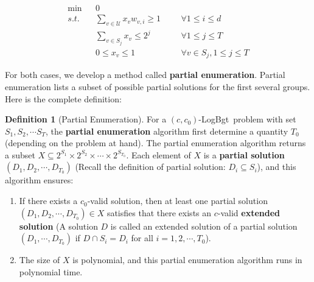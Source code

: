 \documentclass[11pt,a4paper]{article} \usepackage{enumitem}
\newcommand{\calU}{\mathcal{U}}
\newcommand{\LBO}{\textsf{LogBgt}}
\theoremstyle{definition}
\newtheorem{definition}{Definition}[section]
\begin{document}
\begin{equation}
\begin{aligned}
	\min && 0 && & \\
    s.t. && \sum_{v\in \calU} x_v w_{v,i}\geq 1 && & \forall 1\leq i\leq d\\
    && \sum_{v\in S_j} x_v\leq 2^j && & \forall 1\leq j\leq T\\
    && 0\leq x_v\leq 1 && & \forall v\in S_j,1\leq j\leq T
\end{aligned}
\tag{LP-KnapCover-1}
\label{LP-KnapCover-1}
\end{equation}

For both cases, we develop a method called \textbf{partial enumeration}. Partial enumeration lists a subset of possible partial solutions for the first several groups. Here is the complete definition:

\begin{definition}[Partial Enumeration] \label{def:part-enum}
For a $(c,c_0)$-\LBO\ problem with set $S_1,S_2,\cdots S_{T}$, the \textbf{partial enumeration} algorithm first determine a quantity $T_0$ (depending on the problem at hand). The partial enumeration algorithm returns a subset $X\subseteq 2^{S_1}\times 2^{S_2}\times \cdots \times 2^{S_{T_0}}$. Each element of $X$ is a \textbf{partial solution} $(D_1,D_2,\cdots, D_{T_0})$ (Recall the definition of partial solution: $D_i\subseteq S_i$), and this algorithm ensures: 

\begin{enumerate}
    \item If there exists a $c_0$-valid solution, then at least one partial solution $(D_1,D_2,\cdots, D_{T_0})\in X$ satisfies
    that 
    there exists an $c$-valid \textbf{extended solution} (A solution $D$ is called an extended solution of a partial solution $(D_1,\cdots,D_{T_0})$ if $D\cap S_i=D_i$ for all $i=1,2,\cdots, T_0$).

    \item The size of $X$ is polynomial, and this partial enumeration algorithm runs in polynomial time.
\end{enumerate}
\end{definition}
\end{document}
